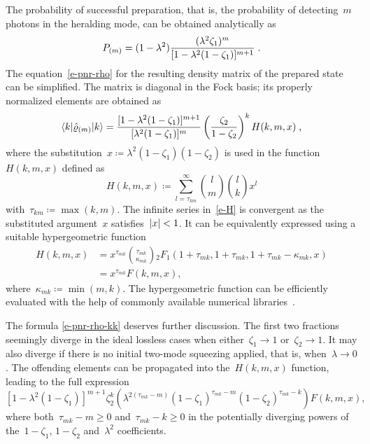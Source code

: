 \documentclass{optica-article}
\begin{document}
The probability of successful preparation, that is, the probability of detecting~$m$ photons in the heralding mode, can be obtained analytically as
%
\begin{equation}\label{e-pnr-pro}
  P_{(m)} = (1 - \lambda^{2}) 
  \frac
    { (\lambda^{2} \zeta_{1})^{m} }
    { [ 1 - \lambda^{2} (1 - \zeta_{1}) ]^{m + 1} } \;\text{.}
\end{equation}
%
The equation~\eqref{e-pnr-rho} for the resulting density matrix of the prepared state can be simplified. The matrix is diagonal in the Fock basis; its properly normalized elements are obtained as
%
\begin{equation}\label{e-pnr-rho-kk}
  \braket{ k | \hat{\varrho}_{(m)} | k } =
  \frac
    { [ 1 - \lambda^{2} (1 - \zeta_{1}) ]^{m + 1} }
    { [ \lambda^{2} (1 - \zeta_{1}) ]^{m} }
  \left( \frac{ \zeta_{2} }{ 1 - \zeta_{2} } \right)^{k}
  H (k, m, x) \;\text{,}
\end{equation}
%
where the substitution~${x \coloneqq \lambda^{2} ( 1 - \zeta_{1} )(1 - \zeta_{2} )}$ is used in the function~$H(k, m, x)$ defined as
%
\begin{equation}\label{e-H}
  H(k, m, x) \coloneq
  \sum\limits_{l = \tau_{km}}^{\infty}
    \binom{l}{m}
    \binom{l}{k}
    x^{l} 
\end{equation}
%
with~${\tau_{km} \coloneqq \max(k, m)}$. The infinite series in~\eqref{e-H} is convergent as the substituted argument~$x$ satisfies~${\lvert x \rvert < 1}$. It can be equivalently expressed using a suitable hypergeometric function~\cite{bateman1981}
%
\begin{equation}
  \begin{aligned}
    H(k, m, x) & =
    x^{\tau_{mk}} 
    \binom
      {\tau_{mk}}
      {\kappa_{mk}}
    {}_{2}F_{1} (
      1 + \tau_{mk},
      1 + \tau_{mk},
      1 + \tau_{mk} - \kappa_{mk},
      x
    ) \\
    & =
    x^{\tau_{mk}} F(k, m, x),
  \end{aligned}
\end{equation}
%
where~${\kappa_{mk} \coloneqq \min (m, k)}$. The hypergeometric function can be efficiently evaluated with the help of commonly available numerical libraries~\cite{virtanen2020}. 

The formula \eqref{e-pnr-rho-kk} deserves further discussion. The first two fractions seemingly diverge in the ideal lossless cases when either~${\zeta_{1} \to 1}$ or~${\zeta_{2} \to 1}$. It may also diverge if there is no initial two-mode squeezing applied, that is, when~${\lambda \to 0}$. The offending elements can be propagated into the~$H(k, m, x)$ function, leading to the full expression
%
\begin{equation}
  { [ 1 - \lambda^{2} (1 - \zeta_{1}) ]^{m + 1} }
  { \zeta_{2}^{k} }
  \left(
    \lambda^{2 (\tau_{mk} - m)}
    (1 - \zeta_{1})^{\tau_{mk} - m}
    (1 - \zeta_{2})^{\tau_{mk} - k}
  \right)
  F (k, m, x),
\end{equation}
%
where both~${\tau_{mk} - m \geq 0}$ and~${\tau_{mk} - k \geq 0}$ in the potentially diverging powers of the~${1 - \zeta_{1}}$, ${1 - \zeta_{2}}$ and~$\lambda^{2}$ coefficients.
\end{document}
